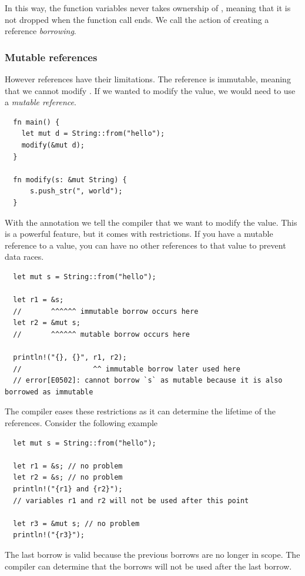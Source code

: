 \documentclass[11pt]{report}
\theoremstyle{definition}
\theoremstyle{plain}
\begin{document}
In this way, the function variables  never takes ownership of , meaning that it is not dropped when the function call ends. We call the action of creating a reference \textit{borrowing}.

\subsubsection{Mutable references}
However references have their limitations. The reference is immutable, meaning that we cannot modify . If we wanted to modify the value, we would need to use a \textit{mutable reference}.

\begin{verbatim}
  fn main() {
    let mut d = String::from("hello");
    modify(&mut d);
  }
  
  fn modify(s: &mut String) {
      s.push_str(", world");
  }
 \end{verbatim}

With the  annotation we tell the compiler that we want to modify the value. This is a powerful feature, but it comes with restrictions. If you have a mutable reference to a value, you can have no other references to that value to prevent data races.
\begin{verbatim}
  let mut s = String::from("hello");

  let r1 = &s;
  //       ^^^^^^ immutable borrow occurs here
  let r2 = &mut s;
  //       ^^^^^^ mutable borrow occurs here

  println!("{}, {}", r1, r2);
  //                 ^^ immutable borrow later used here
  // error[E0502]: cannot borrow `s` as mutable because it is also borrowed as immutable
\end{verbatim}
The compiler eases these restrictions as it can determine the lifetime of the references. Consider the following example
\begin{verbatim}
  let mut s = String::from("hello");

  let r1 = &s; // no problem
  let r2 = &s; // no problem
  println!("{r1} and {r2}");
  // variables r1 and r2 will not be used after this point

  let r3 = &mut s; // no problem
  println!("{r3}");
\end{verbatim}
The last borrow is valid because the previous borrows are no longer in scope. The compiler can determine that the borrows will not be used after the last borrow.
\end{document}
